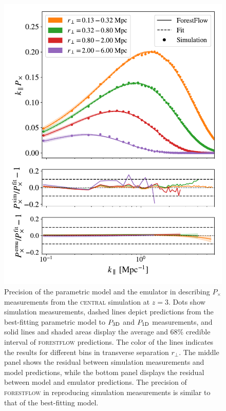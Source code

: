 \documentclass{aa}
\newcommand{\pcross}{$P_{\times}$\xspace}
\newcommand{\poned}{\ensuremath{P_{\rm 1D}}\xspace}
\newcommand{\pthreed}{\ensuremath{P_{\rm 3D}}\xspace}
\newcommand{\forestflow}{\textsc{forestflow}\xspace}
\newcommand{\simcentral}{\textsc{central}\xspace}
\begin{document}
\begin{figure}
    \centering
    \includegraphics[width=.9\columnwidth]{figures/Pcross_central_snap6_kPx_allbin_emupred_first4_withfracerr.pdf}
    \caption{Precision of the parametric model and the emulator in describing \pcross measurements from the \simcentral simulation at $z=3$. Dots show simulation measurements, dashed lines depict predictions from the best-fitting parametric model to \pthreed and \poned measurements, and solid lines and shaded areas display the average and 68\% credible interval of \forestflow predictions. The color of the lines indicates the results for different bins in transverse separation $r_\perp$. The middle panel shows the residual between simulation measurements and model predictions, while the bottom panel displays the residual between model and emulator predictions. The precision of \forestflow in reproducing simulation measurements is similar to that of the best-fitting model.}
    \label{fig:Px_onesnap}
\end{figure}
\end{document}

